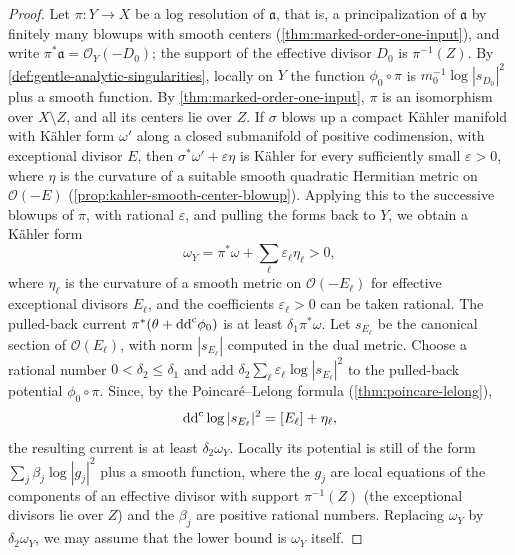 \begin{proof}
Let $\pi\colon Y\to X$ be a log resolution of $\mathfrak a$, that is, a principalization of $\mathfrak a$ by finitely many blowups with smooth centers (\cref{thm:marked-order-one-input}), and write $\pi^*\mathfrak a=\mathcal O_Y(-D_0)$; the support of the effective divisor $D_0$ is $\pi^{-1}(Z)$. By \cref{def:gentle-analytic-singularities}, locally on $Y$ the function $\phi_0\circ\pi$ is $m_0^{-1}\log|s_{D_0}|^2$ plus a smooth function. By \cref{thm:marked-order-one-input}, $\pi$ is an isomorphism over $X\setminus Z$, and all its centers lie over $Z$. If $\sigma$ blows up a compact K\"ahler manifold with K\"ahler form $\omega'$ along a closed submanifold of positive codimension, with exceptional divisor $E$, then $\sigma^*\omega'+\varepsilon\eta$ is K\"ahler for every sufficiently small $\varepsilon>0$, where $\eta$ is the curvature of a suitable smooth quadratic Hermitian metric on $\mathcal O(-E)$ (\cref{prop:kahler-smooth-center-blowup}). Applying this to the successive blowups of $\pi$, with rational $\varepsilon$, and pulling the forms back to $Y$, we obtain a K\"ahler form
\[
 \omega_Y=\pi^*\omega+\sum_\ell\varepsilon_\ell\eta_\ell>0,
\]
where $\eta_\ell$ is the curvature of a smooth metric on $\mathcal O(-E_\ell)$ for effective exceptional divisors $E_\ell$, and the coefficients $\varepsilon_\ell>0$ can be taken rational. The pulled-back current $\pi^*(\theta+\mathrm{dd}^{\mathrm{c}}\phi_0)$ is at least $\delta_1\pi^*\omega$. Let $s_{E_\ell}$ be the canonical section of $\mathcal O(E_\ell)$, with norm $|s_{E_\ell}|$ computed in the dual metric. Choose a rational number $0<\delta_2\leq\delta_1$ and add $\delta_2\sum_\ell\varepsilon_\ell\log|s_{E_\ell}|^2$ to the pulled-back potential $\phi_0\circ\pi$. Since, by the Poincar\'e--Lelong formula (\cref{thm:poincare-lelong}),
\[
 \mathrm{dd}^{\mathrm{c}}\log|s_{E_\ell}|^2=[E_\ell]+\eta_\ell,
\]
the resulting current is at least $\delta_2\omega_Y$. Locally its potential is still of the form $\sum_j\beta_j\log|g_j|^2$ plus a smooth function, where the $g_j$ are local equations of the components of an effective divisor with support $\pi^{-1}(Z)$ (the exceptional divisors lie over $Z$) and the $\beta_j$ are positive rational numbers. Replacing $\omega_Y$ by $\delta_2\omega_Y$, we may assume that the lower bound is $\omega_Y$ itself.


\end{proof}
